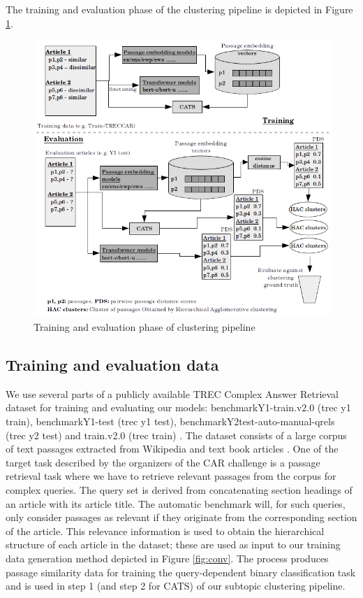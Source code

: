 The training and evaluation phase of the clustering pipeline is depicted in Figure \ref{fig:pipe}.
\begin{figure}[h]
  \centering
  \includegraphics[width=\linewidth]{graphics/pipeline2.png}
  \caption{Training and evaluation phase of clustering pipeline}
  \label{fig:pipe}
\end{figure}

\subsection{Training and evaluation data} 
We use several parts of a publicly available TREC Complex Answer Retrieval dataset for training and evaluating our models: benchmarkY1-train.v2.0 (trec y1 train), benchmarkY1-test (trec y1 test), benchmarkY2test-auto-manual-qrels (trec y2 test) and train.v2.0 (trec train) . The dataset consists of a large corpus of text passages extracted from Wikipedia and text book articles . One of the target task described by the organizers of the CAR challenge  is a passage retrieval task where we have to retrieve relevant passages from the corpus for complex queries. The query set is derived from concatenating section headings of an article with its article title. The automatic benchmark will, for such queries, only consider passages as relevant if they originate from the corresponding section of the article. This relevance information is used to obtain the hierarchical structure of each article in the dataset; these are used as input to our training data generation method depicted in Figure \ref{fig:conv}.  The process produces passage similarity data for training the query-dependent binary classification task and is used in step 1 (and step 2 for CATS) of our subtopic clustering pipeline.

